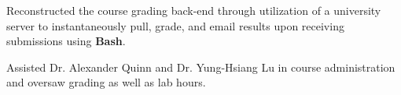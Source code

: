 \documentclass[letterpaper]{deedy-resume} %
\begin{document}
\begin{minipage}[t]{0.66\textwidth}
\begin{tightitemize}
\item Reconstructed the course grading back-end through utilization of a university server to instantaneously pull, grade, and email results upon receiving submissions using \textbf{Bash}.
\item Assisted Dr. Alexander Quinn and Dr. Yung-Hsiang Lu in course administration and oversaw grading as well as lab hours.
\end{tightitemize}

\sectionspace %


\end{minipage} %
\end{document}
